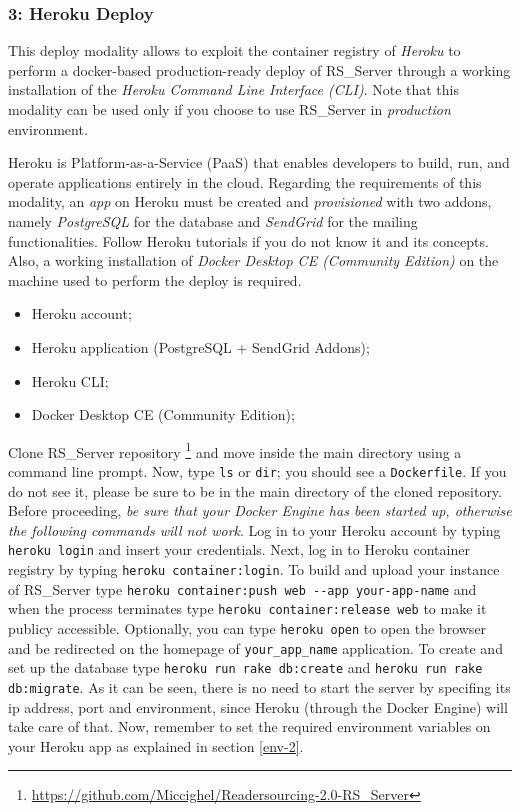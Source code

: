 \documentclass[a4paper, english]{article}
\newcounter{subsubsubsection}[subsubsection]
\begin{document}
\subsubsection{3: Heroku Deploy}

This deploy modality allows to exploit the container registry of \emph{Heroku}  to perform a docker-based production-ready deploy of RS\_Server through a working installation of the \emph{Heroku Command Line Interface (CLI)}. Note that this modality can be used only if you choose to use RS\_Server in \emph{production} environment.

Heroku is Platform-as-a-Service (PaaS) that enables developers to build, run, and operate applications entirely in the cloud. Regarding the requirements of this modality, an \emph{app} on Heroku must be created and \emph{provisioned} with two addons, namely \emph{PostgreSQL} for the database and \emph{SendGrid} for the mailing functionalities. Follow Heroku tutorials if you do not know it and its concepts. Also, a working installation of \emph{Docker Desktop CE (Community Edition)} on the machine used to perform the deploy is required.


\begin{itemize}
\item Heroku account;
\item Heroku application (PostgreSQL + SendGrid Addons);
\item Heroku CLI;
\item Docker Desktop CE (Community Edition);
\end{itemize}


Clone RS\_Server repository \footnote{\url{https://github.com/Miccighel/Readersourcing-2.0-RS_Server}} and move inside the main directory using a command line prompt. Now, type \verb|ls| or \verb|dir|; you should see a \verb|Dockerfile|. If you do not see it, please be sure to be in the main directory of the cloned repository. Before proceeding, \emph{be sure that your Docker Engine has been started up, otherwise the following commands will not work}. Log in to your Heroku account by typing \verb|heroku login| and insert your credentials. Next, log in to Heroku container registry by typing \verb|heroku container:login|. To build and upload your instance of RS\_Server type \verb|heroku container:push web --app your-app-name| and when the process terminates type \verb|heroku container:release web| to make it publicy accessible. Optionally, you can type \verb|heroku open| to open the browser and be redirected on the homepage of  \verb|your_app_name| application. To create and set up the database type \verb|heroku run rake db:create| and \verb|heroku run rake db:migrate|. As it can be seen, there is no need to start the server by specifing its ip address, port and environment, since Heroku (through the Docker Engine) will take care of that. Now, remember to set the required environment variables on your Heroku app as explained in section \ref{env-2}.
\end{document}
